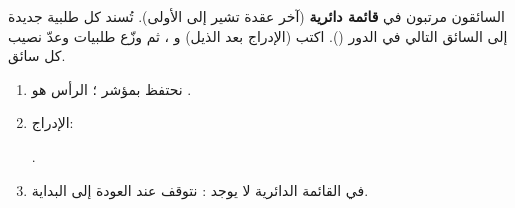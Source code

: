 \begin{statement}
السائقون مرتبون في \textbf{قائمة دائرية} (آخر عقدة تشير إلى الأولى). تُسند كل طلبية جديدة إلى السائق التالي في الدور (). اكتب  (الإدراج بعد الذيل) و ، ثم وزّع  طلبيات وعدّ نصيب كل سائق.
\end{statement}
\begin{stepsbox}\begin{enumerate}
\item نحتفظ بمؤشر ؛ الرأس هو .
\item الإدراج: \par{\centering\small{}\par}.
\item في القائمة الدائرية لا يوجد : نتوقف عند العودة إلى البداية.
\end{enumerate}\end{stepsbox}
